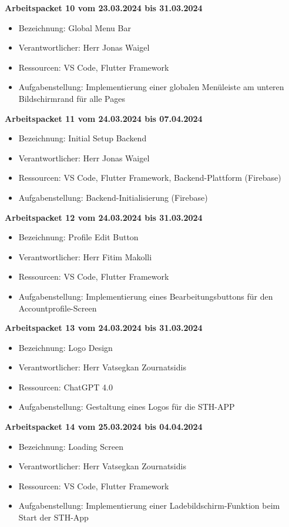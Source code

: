 \textbf{Arbeitspacket 10 vom 23.03.2024 bis 31.03.2024}
\begin{itemize}[itemsep=0pt]
    \item{Bezeichnung: Global Menu Bar} 
	\item{Verantwortlicher: Herr Jonas Waigel} 
	\item{Ressourcen: VS Code, Flutter Framework} 
    \item{Aufgabenstellung: Implementierung einer globalen Menüleiste am unteren Bildschirmrand für alle Pages}
\end{itemize} 

\textbf{Arbeitspacket 11 vom 24.03.2024 bis 07.04.2024}
\begin{itemize}[itemsep=0pt]
    \item{Bezeichnung: Initial Setup Backend} 
	\item{Verantwortlicher: Herr Jonas Waigel} 
	\item{Ressourcen: VS Code, Flutter Framework, Backend-Plattform (Firebase)}
    \item{Aufgabenstellung: Backend-Initialisierung (Firebase)}
\end{itemize}

\textbf{Arbeitspacket 12 vom 24.03.2024 bis 31.03.2024}
\begin{itemize}[itemsep=0pt]
    \item{Bezeichnung: Profile Edit Button} 
	\item{Verantwortlicher: Herr Fitim Makolli} 
	\item{Ressourcen: VS Code, Flutter Framework} 
    \item{Aufgabenstellung: Implementierung eines Bearbeitungsbuttons für den Accountprofile-Screen}
\end{itemize}

\textbf{Arbeitspacket 13 vom 24.03.2024 bis 31.03.2024}
\begin{itemize}[itemsep=0pt]
    \item{Bezeichnung: Logo Design} 
	\item{Verantwortlicher: Herr Vatsegkan Zournatsidis} 
	\item{Ressourcen: ChatGPT 4.0}
    \item{Aufgabenstellung: Gestaltung eines Logos für die STH-APP}
\end{itemize} 

\textbf{Arbeitspacket 14 vom 25.03.2024 bis 04.04.2024}
\begin{itemize}[itemsep=0pt]
    \item{Bezeichnung: Loading Screen} 
	\item{Verantwortlicher: Herr Vatsegkan Zournatsidis} 
	\item{Ressourcen: VS Code, Flutter Framework} 
    \item{Aufgabenstellung: Implementierung einer Ladebildschirm-Funktion beim Start der STH-App}
\end{itemize}

